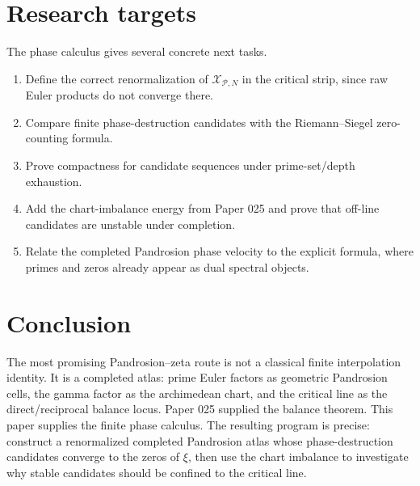\documentclass[11pt]{article}
\newcommand{\Pset}{\mathcal P}
\newcommand{\X}{\mathcal X}
\begin{document}
\section{Research targets}

The phase calculus gives several concrete next tasks.

\begin{enumerate}[leftmargin=2em]
\item Define the correct renormalization of \(\X_{\Pset,N}\) in the critical
strip, since raw Euler products do not converge there.
\item Compare finite phase-destruction candidates with the Riemann--Siegel
zero-counting formula.
\item Prove compactness for candidate sequences under prime-set/depth
exhaustion.
\item Add the chart-imbalance energy from Paper 025 and prove that off-line
candidates are unstable under completion.
\item Relate the completed Pandrosion phase velocity to the explicit formula,
where primes and zeros already appear as dual spectral objects.
\end{enumerate}

\section{Conclusion}

The most promising Pandrosion--zeta route is not a classical finite
interpolation identity.  It is a completed atlas: prime Euler factors as
geometric Pandrosion cells, the gamma factor as the archimedean chart, and the
critical line as the direct/reciprocal balance locus.  Paper 025 supplied the
balance theorem.  This paper supplies the finite phase calculus.  The resulting
program is precise: construct a renormalized completed Pandrosion atlas whose
phase-destruction candidates converge to the zeros of \(\xi\), then use the
chart imbalance to investigate why stable candidates should be confined to the
critical line.
\end{document}
